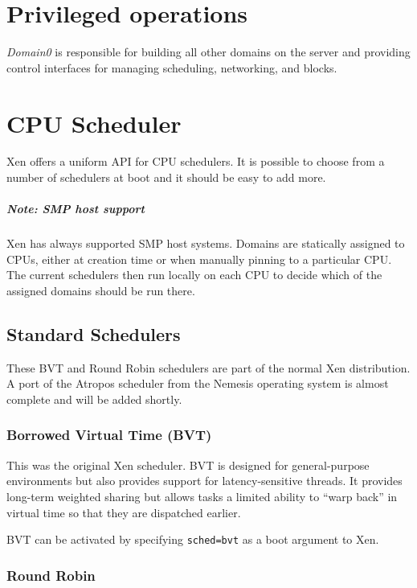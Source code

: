 \documentclass[11pt,twoside,final,openright]{xenstyle}
\begin{document}

\chapter{Privileged operations}
{\it Domain0} is responsible for building all other domains on the server
and providing control interfaces for managing scheduling, networking, and
blocks.

\chapter{CPU Scheduler}

Xen offers a uniform API for CPU schedulers.  It is possible to choose
from a number of schedulers at boot and it should be easy to add more.

\paragraph*{Note: SMP host support}
Xen has always supported SMP host systems.  Domains are statically assigned to
CPUs, either at creation time or when manually pinning to a particular CPU.
The current schedulers then run locally on each CPU to decide which of the
assigned domains should be run there.

\section{Standard Schedulers}

These BVT and Round Robin schedulers are part of the normal Xen
distribution.  A port of the Atropos scheduler from the Nemesis
operating system is almost complete and will be added shortly.

\subsection{Borrowed Virtual Time (BVT)}

This was the original Xen scheduler.  BVT is designed for general-purpose
environments but also provides support for latency-sensitive threads.  It
provides long-term weighted sharing but allows tasks a limited ability to
``warp back'' in virtual time so that they are dispatched earlier.

BVT can be activated by specifying {\tt sched=bvt} as a boot argument to Xen.

\subsection{Round Robin}
\end{document}
